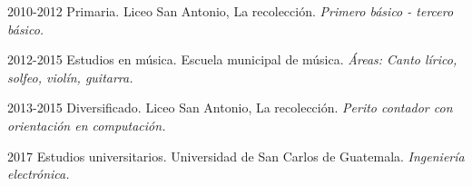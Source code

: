 \documentclass[]{twentysecondcv}
\begin{document}
\begin{twenty}
  
  \twentyitem 
    {2010-2012}
    {{\normalfont Primaria.}}    
    {Liceo San Antonio, La recolecci\'on.}
    {\emph{Primero b\'asico - tercero b\'asico.}}
    
  \twentyitem 
    {2012-2015}
    {{\normalfont Estudios en m\'usica.}}
    {Escuela municipal de m\'usica.}
    {\emph{\'Areas: Canto l\'irico, solfeo, viol\'in, guitarra.}}  
    
  \twentyitem
    {2013-2015}
    {{\normalfont Diversificado.}}
    {Liceo San Antonio, La recolecci\'on.}
    {\emph{Perito contador con orientaci\'on en computaci\'on.}}

  \twentyitem
    {2017}
    {Estudios universitarios.}
    {Universidad de San Carlos de Guatemala.}
    {\emph{Ingenier\'ia electr\'onica.}}
    
\end{twenty}



\end{document}
